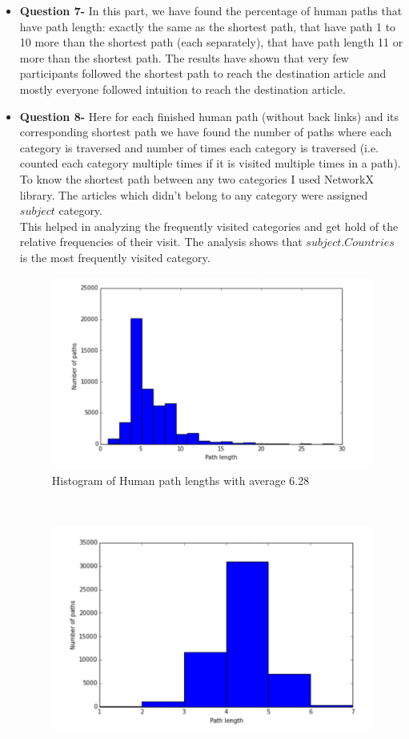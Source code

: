 \documentclass{article}
\begin{document}
\begin{itemize}
\item \textbf{Question 7- }In this part, we have found the percentage of human paths that have path length: exactly the same as the shortest path, that have path 1 to 10 more than the shortest path (each separately), that have path length 11 or more than the shortest path. The results have shown that very few participants followed the shortest path to reach the destination article and mostly everyone followed intuition to reach the destination article.
\item \textbf{Question 8- }Here for each finished human path (without back links) and its corresponding shortest
path we have found the number of paths where each category is traversed and number of times each category is traversed (i.e. counted each category multiple times if it is visited multiple times in a path). To know the shortest path between any two categories I used NetworkX library. The articles which didn't belong to any category were assigned $subject$ category.\\
This helped in analyzing the frequently visited categories and get hold of the relative frequencies of their visit. The analysis shows that $subject.Countries$ is the most frequently visited category. \\
\begin{figure}[h]
\centerline{\includegraphics[scale=0.45]{photo2.png}}
\caption{Histogram of Human path lengths with average 6.28}
\label{fig}
\end{figure}\\
\begin{figure}[h]
\centerline{\includegraphics[scale=0.4]{photo3.png}}

\end{figure}
\end{itemize}
\end{document}
